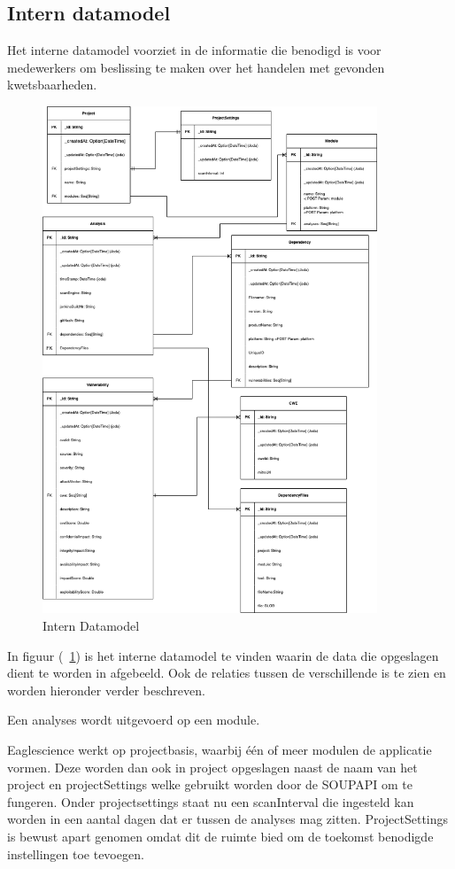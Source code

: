 \subsection{Intern datamodel}\label{subsec:intern-datamodel}
Het interne datamodel voorziet in de informatie die benodigd is voor medewerkers om beslissing te maken over het handelen met gevonden kwetsbaarheden.
\begin{figure}[bth]
    \myfloatalign
    \includegraphics[width=10cm]{gfx/SOUPAPI-SOUPAPI DM}
    \caption{Intern Datamodel}
    \label{fig:SOUP-SoupApiDm}
\end{figure}
In figuur (~\ref{fig:SOUP-SoupApiDm}) is het interne datamodel te vinden waarin de data die opgeslagen dient te worden in afgebeeld. Ook de relaties tussen de verschillende is te zien en worden hieronder verder beschreven.

Een analyses wordt uitgevoerd op een module.

Eaglescience werkt op projectbasis, waarbij één of meer modulen de applicatie vormen. Deze worden dan ook in project opgeslagen naast de naam van het project en projectSettings welke gebruikt worden door de SOUPAPI om te fungeren. Onder projectsettings staat nu een scanInterval die ingesteld kan worden in een aantal dagen dat er tussen de analyses mag zitten. ProjectSettings is bewust apart genomen omdat dit de ruimte bied om de toekomst benodigde instellingen toe tevoegen.

